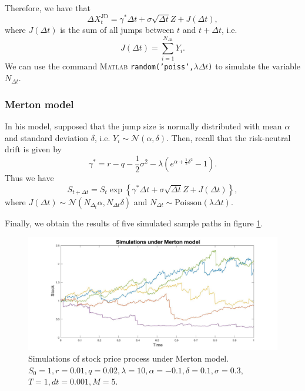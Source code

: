 Therefore, we have that
$$\Delta X_t^\text{JD} = \gamma^\ast \Delta t + \sigma \sqrt{\Delta t} Z + J(\Delta t),$$
where $J(\Delta t)$ is the sum of all jumps between $t$ and $t+\Delta t$, i.e.
$$J(\Delta t)=\sum_{i=1}^{N_{\Delta t}}Y_i.$$
We can use the command \textsc{Matlab} \texttt{random('poiss',$\lambda \Delta t$)} to simulate the variable $N_{\Delta t}$.
\subsubsection{Merton model}
In his model, \citeauthor{Mer76} supposed that the jump size is normally distributed with mean $\alpha$ and standard deviation $\delta$, i.e. $Y_i\sim\mathcal{N}(\alpha,\delta)$. Then, recall that the risk-neutral drift is given by
$$\gamma^\ast = r-q-\frac{1}{2}\sigma^2-\lambda\left(e^{\alpha+\frac{1}{2}\delta^2}-1\right).$$
Thus we have
$$S_{t+\Delta t} = S_t\exp\left\{\gamma^\ast \Delta t + \sigma \sqrt{\Delta t}Z + J(\Delta t)\right\},$$
where $J(\Delta t)\sim\mathcal{N}(N_{\Delta_t}\alpha,N_{\Delta t}\delta)$ and $N_{\Delta t}\sim\text{Poisson}(\lambda\Delta t)$.

Finally, we obtain the results of five simulated sample paths in figure \ref{fig:MC:Mer}.
\begin{figure}[!htb]
	\includegraphics[width=\textwidth]{gfx/Merton_plot}
	\caption{Simulations of stock price process under Merton model.\\ $S_0=1, r= 0.01,q = 0.02,\lambda = 10 , \alpha = -0.1, \delta = 0.1, \sigma=0.3,$\\$T = 1, dt = 0.001, M=5$.}
	\label{fig:MC:Mer}
\end{figure}

\newpage
